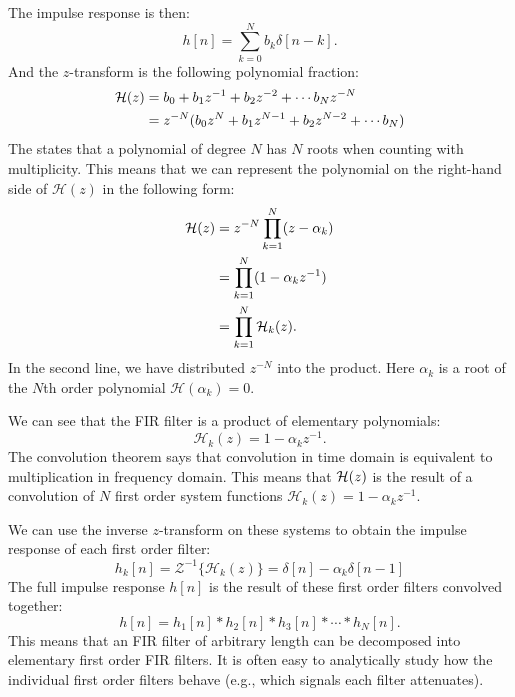 The impulse response is then: 
\begin{equation}
  h[n] = \sum_{k=0}^{N} b_k \delta[n-k].
\end{equation}
And the $z$-transform is the following polynomial fraction:
\begin{align}
  \mathcal{H}(z) &=  b_0 + b_1 z^{-1} + b_2 z^{-2} + \cdots b_N z^{-N} \\
       &=  z^{-N} (b_0z^{N} + b_1 z^{N-1} + b_2 z^{N-2} + \cdots b_N) 
\end{align}
The \emph{} states that a polynomial of degree $N$ has $N$
roots when counting with multiplicity. This means that we can represent the polynomial on the right-hand side of
$\mathcal{H}(z)$ in the following form:
\begin{align}
    \mathcal{H}(z)  &= z^{-N} \prod_{k=1}^{N} (z-\alpha_k)\\
          &=  \prod_{k=1}^{N} (1-\alpha_k z^{-1})\\
          &= \prod_{k=1}^{N}\mathcal{H}_k(z).
\end{align}
In the second line, we have distributed $z^{-N}$ into the
product. Here $\alpha_k$ is a root of the $N$th order polynomial
$\mathcal{H}(\alpha_k)=0$.

We can see that the FIR filter is a product of elementary polynomials:
\begin{equation}
  \mathcal{H}_k(z) = 1-\alpha_k z^{-1}.
 \end{equation}
The convolution theorem says that convolution in time domain is
equivalent to multiplication in frequency domain. This means that
$\mathcal{H}(z)$ is the result of a convolution of $N$ first order system
functions $\mathcal{H}_k(z)=1-\alpha_k z^{-1}$.

We can use the inverse $z$-transform on these systems to obtain the impulse
response of each first order filter:
\begin{equation}
  h_k[n] = \mathcal{Z}^{-1}\{\mathcal{H}_k(z)\} = \delta[n]-\alpha_k \delta[n-1]
\end{equation}
The full impulse response $h[n]$ is the result of these first order filters convolved together:
\begin{equation}
h[n] = h_1[n]*h_2[n]*h_3[n]*\cdots*h_{N}[n].
\end{equation}
This means that an FIR filter of arbitrary length can be decomposed
into elementary first order FIR filters. It is often easy to
analytically study how the individual first order filters behave (e.g.,
which signals each filter attenuates).


